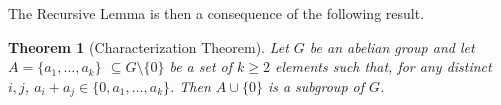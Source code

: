 \documentclass[11pt]{amsart}
\newtheorem{theorem}{Theorem}[section]
\theoremstyle{definition}
\begin{document}
	


The Recursive Lemma %
is then a consequence of the following result.

\begin{theorem}[Characterization Theorem]\label{prop:another_3}
	Let $G$ be an abelian group and let $A=\{a_1,\ldots,a_k\}$ $\subseteq G\setminus \{0\}$ be a set of $k\geq 2$ elements such that, for any distinct $i,j$, $a_i+a_j\in \{0,a_1,\ldots,a_k\}$. Then $A\cup \{0\}$  is a subgroup of $G$.
\end{theorem}
\end{document}
